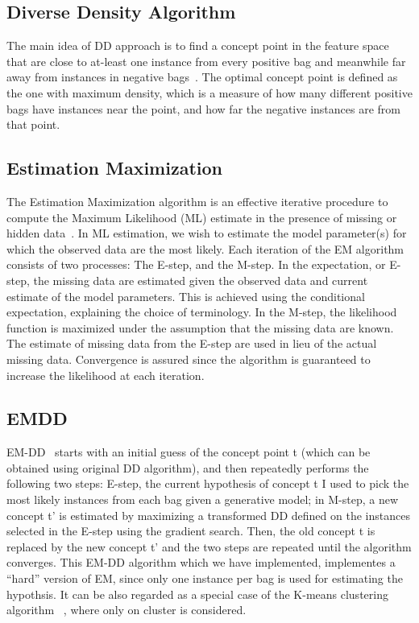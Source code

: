\documentclass[conference,compsoc]{IEEEtran}
\begin{document}
\subsection{Diverse Density Algorithm}
The main idea of DD approach is to find a concept point in the feature space that are close to at-least one instance from every positive bag and meanwhile far away from instances in negative bags~\cite{MILlink}. The optimal concept point is defined as the one with maximum density, which is a measure of how many different positive bags have instances near the point, and how far the negative instances are from that point.
\subsection{Estimation Maximization}
The Estimation Maximization algorithm is an effective iterative procedure to compute the Maximum Likelihood (ML) estimate in the presence of missing or hidden data~\cite{EMlink}. In ML estimation, we wish to estimate the model parameter(s) for which the observed data are the most likely.
Each iteration of the EM algorithm consists of two processes: The E-step, and the M-step. In the expectation, or E-step, the missing data are estimated given the observed data and current estimate of the model parameters. This is achieved using the conditional expectation, explaining the choice of terminology. In the M-step, the likelihood function is maximized under the assumption that the missing data are known. The estimate of missing data from the E-step are used in lieu of the actual missing data.
Convergence is assured since the algorithm is guaranteed to increase the likelihood at each iteration.
\subsection{EMDD}
EM-DD~\cite{MILlink} starts with an initial guess of the concept point t (which can be obtained using original DD algorithm), and then repeatedly performs the following two steps: E-step, the current hypothesis of concept t I used to pick the most likely instances from each bag given a generative model; in M-step, a new concept t’ is estimated by maximizing a transformed DD defined on the instances selected in the E-step using the gradient search. Then, the old concept t is replaced by the new concept t’ and the two steps are repeated until the algorithm converges. This EM-DD algorithm which we have implemented, implementes a “hard” version of EM, since only one instance per bag is used for estimating the hypothsis. It can be also regarded as a special case of the K-means clustering algorithm~\cite{Harti} , where only on cluster is considered.
\end{document}
